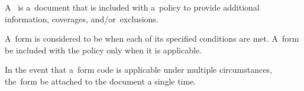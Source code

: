 
\incomplete
{}

A~ is a~document that is included with a~policy to provide additional
information, coverages, and/or~exclusions.

A~form is considered to be  when each of its specified
conditions are met. A~form \shall be included with the policy only when it is
applicable.

In the event that a~form code is applicable under multiple circumstances,
the~form \shall be attached to the document a single time.
